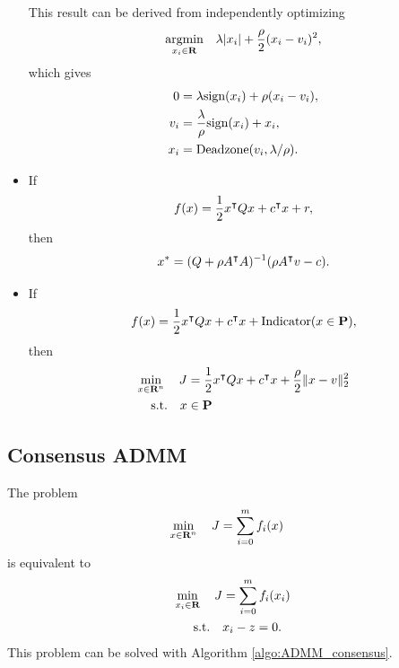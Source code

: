 \documentclass{article}
\begin{document}
\begin{itemize}
            This result can be derived from independently optimizing
            \begin{align*}
                \underset{x_i\in\textbf{R}}{\text{argmin}}\quad \lambda |x_i|+\frac{\rho}{2} (x_i-v_i)^2,
            \end{align*}
            which gives
            \begin{align*}
                0&=\lambda \text{sign}(x_i)+\rho(x_i-v_i),\\
                v_i &= \frac{\lambda}{\rho} \text{sign}(x_i)+x_i,\\
                x_i &= \text{Deadzone}(v_i,\lambda/\rho).
            \end{align*}
        \item If
            \begin{align*}
            f(x)=\frac{1}{2} x^\intercal Q x + c^\intercal x +r,
        \end{align*}
        then
            \begin{align*}
                x^*=(Q+\rho A^\intercal A)^{-1}(\rho A^\intercal v - c).
            \end{align*}
        \item If
            \begin{align*}
                f(x)=\frac{1}{2} x^\intercal Q x + c^\intercal x+\text{Indicator}(x\in\textbf{P}),
            \end{align*}
            then
            \begin{align*}
                \min_{x\in\textbf{R}^n}\quad J&=\frac{1}{2} x^\intercal Q x + c^\intercal x+\frac{\rho}{2}\|x-v\|_2^2\\
                \text{s.t.}\quad x&\in\textbf{P}
            \end{align*}
    \end{itemize}

\clearpage
\subsection{Consensus ADMM}

    The problem
    \begin{align*}
        \min_{x\in\textbf{R}^n}\quad J&=\sum_{i=0}^m f_i(x)
    \end{align*}
    is equivalent to
    \begin{align*}
        \min_{x_i\in\textbf{R}}\quad J&=\sum_{i=0}^m f_i(x_i)\\
        \text{s.t.}\quad &x_i-z=0.
    \end{align*}
    This problem can be solved with Algorithm \ref{algo:ADMM_consensus}.
\end{document}
